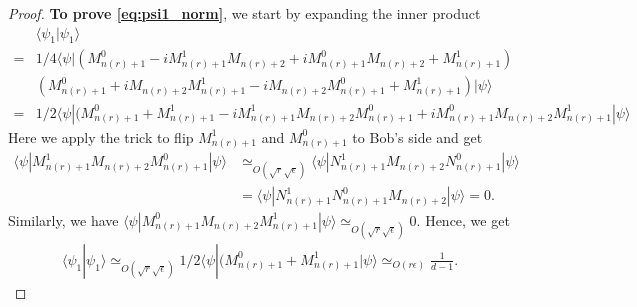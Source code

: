 \documentclass[11pt,letterpaper]{article}
\newcommand{\ket}[1]{|#1\rangle}
\newcommand{\bra}[1]{\langle#1|}
\newcommand{\braket}[2]{\langle#1|#2\rangle}
\DeclarePairedDelimiter{\norm}{\lVert}{\rVert}
\newcommand{\1}{\mathbb{1}}
\newcommand{\nr}{n(r)}
\newcommand{\ep}{\epsilon}
\newcommand{\se}{\sqrt{\epsilon}}
\newcommand{\sd}{\sqrt{d}}
\newcommand{\sr}{\sqrt{r}}
\newcommand{\appd}[1]{\simeq_{#1}}
\theoremstyle{definition}
\begin{document}
\begin{proof}
    \textbf{To prove \cref{eq:psi1_norm}}, 
	we start by expanding the inner product
	\begin{align*}
		&\braket{\psi_1}{\psi_1} \\
		=&1/4\bra{\psi}(M_{\nr+1}^0 - iM_{\nr+1}^1M_{\nr+2} + iM_{\nr+1}^0M_{\nr+2} +M_{\nr+1}^1)\\
		&(M_{\nr+1}^0 + iM_{\nr+2}M_{\nr+1}^1 -iM_{\nr+2}M_{\nr+1}^0 + M_{\nr+1}^1)\ket{\psi}\\
		=&1/2\bra{\psi}(M_{\nr+1}^0+M_{\nr+1}^1-iM_{\nr+1}^1M_{\nr+2}M_{\nr+1}^0+iM_{\nr+1}^0M_{\nr+2}M_{\nr+1}^1\ket{\psi}
	\end{align*}
	Here we apply the trick to flip $M_{\nr+1}^1$ and $M_{\nr+1}^0$ to Bob's side and get 
	\begin{align*}
		\bra{\psi}M_{\nr+1}^1M_{\nr+2}M_{\nr+1}^0\ket{\psi} 
		&\appd{O(\sr\se)} \bra{\psi}N_{\nr+1}^1M_{\nr+2}N_{\nr+1}^0\ket{\psi} \\
		&= \bra{\psi}N_{\nr+1}^1N_{\nr+1}^0M_{\nr+2}\ket{\psi} = 0.
	\end{align*}
	Similarly, we have $\bra{\psi}M_{\nr+1}^0M_{\nr+2}M_{\nr+1}^1\ket{\psi} \appd{ O(\sr \se)} 0$.
	Hence, we get 
	\begin{align}
		\braket{\psi_1}{\psi_1} \appd{O(\sr\se)} 1/2\bra{\psi}(M_{\nr+1}^0+M_{\nr+1}^1\ket{\psi} \appd{O(r\ep)} 
		 \frac{1}{d-1}.
	\end{align}
	

\end{proof}
\end{document}
